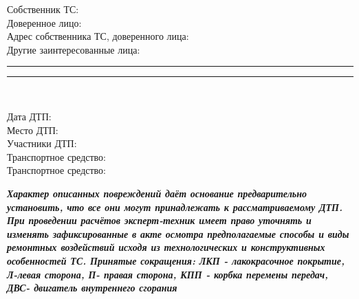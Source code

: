 \documentclass[a4paper,10pt]{report}
\begin{document}
\noindent Собственник ТС: \\
Доверенное лицо: \\
Адрес собственника ТС, доверенного лица: \\
Другие заинтересованные лица: \\


\begin{tcolorbox}[title=\textsl{Комплектация,  дополнительные и нестандартные опции},leftrule=0pt,rightrule=0pt,toprule=0pt,titlerule=0pt,sharp corners,
	colback=white,colframe=white,coltitle=black,colbacktitle=YellowOrange]
	\end{tcolorbox}
\vspace{-7mm}
\noindent\rule{170mm}{0.1mm}
\rule{170mm}{0.1mm}\\

\begin{tcolorbox}[title=\textsl{Сведения о ДТП},leftrule=0pt,rightrule=0pt,toprule=0pt,titlerule=0pt,sharp corners,
	colback=white,colframe=white,coltitle=black,colbacktitle=YellowOrange]
	
	Дата ДТП: \\
	Место ДТП: \\
	Участники ДТП:\\
	Транспортное средство: \\ 
	Транспортное средство: \tca\\
\end{tcolorbox}
\vspace{-7mm}
\begin{tcolorbox}[title=\textsl{Результат осмотра},leftrule=0pt,rightrule=0pt,toprule=0pt,titlerule=0pt,sharp corners,
	colback=white,colframe=white,coltitle=black,colbacktitle=YellowOrange]
\end{tcolorbox}

\vspace{-12mm}

\vspace{-3mm}
\begin{spacing}{.65}
\begin{tcolorbox}[title=\textsl{Примечание},leftrule=-0.4pt,rightrule=-0.4pt,toprule=0pt,titlerule=0pt,sharp corners,
	colback=white,colframe=black,coltitle=black,colbacktitle=YellowOrange]
{\footnotesize \textbf{\textit{{Характер описанных повреждений даёт основание предварительно установить, что все они могут принадлежать
				к рассматриваемому ДТП. При проведении расчётов эксперт-техник имеет право уточнять и изменять зафиксированные в акте осмотра предполагаемые способы и
				виды ремонтных воздействий исходя из технологических и конструктивных особенностей ТС. Принятые сокращения: ЛКП - лакокрасочное
				покрытие, Л-левая сторона, П- правая сторона, КПП - корбка перемены передач, ДВС- двигатель внутреннего сгорания}}}}
\end{tcolorbox}
\end{spacing}
\vspace{2mm}
\end{document}
